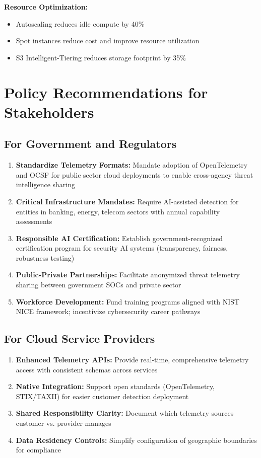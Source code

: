 \textbf{Resource Optimization:}
\begin{itemize}
    \item Autoscaling reduces idle compute by 40\%
    \item Spot instances reduce cost and improve resource utilization
    \item S3 Intelligent-Tiering reduces storage footprint by 35\%
\end{itemize}

\section{Policy Recommendations for Stakeholders}\label{sec:policy-recommendations}
\subsection{For Government and Regulators}
\begin{enumerate}
    \item \textbf{Standardize Telemetry Formats:} Mandate adoption of OpenTelemetry and OCSF for public sector cloud deployments to enable cross-agency threat intelligence sharing
    \item \textbf{Critical Infrastructure Mandates:} Require AI-assisted detection for entities in banking, energy, telecom sectors with annual capability assessments
    \item \textbf{Responsible AI Certification:} Establish government-recognized certification program for security AI systems (transparency, fairness, robustness testing)
    \item \textbf{Public-Private Partnerships:} Facilitate anonymized threat telemetry sharing between government SOCs and private sector
    \item \textbf{Workforce Development:} Fund training programs aligned with NIST NICE framework; incentivize cybersecurity career pathways
\end{enumerate}

\subsection{For Cloud Service Providers}
\begin{enumerate}
    \item \textbf{Enhanced Telemetry APIs:} Provide real-time, comprehensive telemetry access with consistent schemas across services
    \item \textbf{Native Integration:} Support open standards (OpenTelemetry, STIX/TAXII) for easier customer detection deployment
    \item \textbf{Shared Responsibility Clarity:} Document which telemetry sources customer vs. provider manages
    \item \textbf{Data Residency Controls:} Simplify configuration of geographic boundaries for compliance
\end{enumerate}

